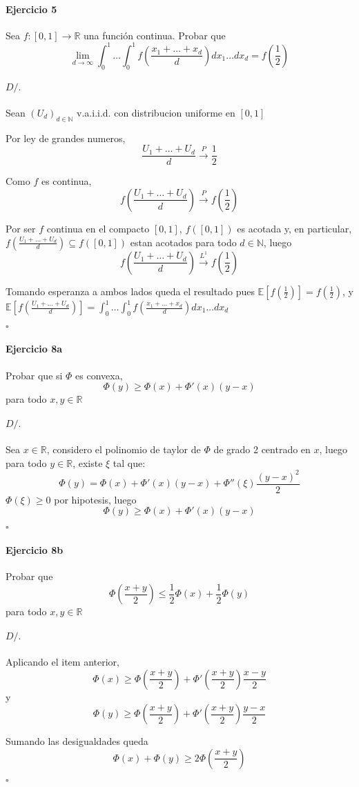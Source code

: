 \documentclass[10pt,a4paper]{article}
\newcommand{\R}{ \mathbb R }
\newcommand{\E}{ \mathbb E }
\newenvironment{ejercicio}[3]
{
	\paragraph{Ejercicio #1}
	#2
	\paragraph{$D/.$}
	#3
	$\square$
}{
}
\begin{document}
\begin{ejercicio}{5}{
	Sea $f:[0,1] \to \R$ una funci\'on continua. Probar que
	$$
		\lim_{d\to\infty}
		\int_0^1 \dots \int_0^1
		f(
		\frac{
			x_1 + \dots + x_d
		}{d}
		)
		dx_1 \dots dx_d
		=
		f(\frac{1}{2})
	$$
}{
	Sean $(U_d)_{d \in \mathbb N}$ v.a.i.i.d. con distribucion uniforme en $[0,1]$

	Por ley de grandes numeros,
	$$
		\frac {U_1 + \dots + U_d}{d} \overset{P}{\to} \frac{1}{2}
	$$

	Como $f$ es continua,
	$$
		f(\frac {U_1 + \dots + U_d}{d}) \overset{P}{\to} f(\frac{1}{2})
	$$

	Por ser $f$ continua en el compacto $[0,1]$, $f([0,1])$ es acotada y, en particular, $f(\frac {U_1 + \dots + U_d}{d}) \subseteq f([0,1])$ estan acotados para todo $d \in \mathbb N$, luego
	$$
		f(\frac {U_1 + \dots + U_d}{d}) \overset{L^1}{\to} f(\frac{1}{2})
	$$


	Tomando esperanza a ambos lados queda el resultado pues $\E[f(\frac{1}{2})] = f(\frac{1}{2})$, y
	$\E[f(\frac {U_1 + \dots + U_d}{d})]
	=
	\int_0^1 \dots \int_0^1
	f(
	\frac{
		x_1 + \dots + x_d
	}{d}
	)
	dx_1 \dots dx_d$

}
\end{ejercicio}


\begin{ejercicio}{8a}{
	Probar que si $\Phi$ es convexa,
	$$
		\Phi(y) \ge \Phi(x) + \Phi'(x)(y-x)
	$$
	para todo $ x,y \in \R $
}{
	Sea $x \in \R$, considero el polinomio de taylor de $\Phi$ de grado 2 centrado en $x$, luego para todo $y \in \R$, existe $\xi$ tal que:
	$$
		\Phi(y) = \Phi(x) + \Phi'(x) (y-x) + \Phi''(\xi) \frac{(y-x)^2}{2}
	$$
	$\Phi(\xi) \ge 0$ por hipotesis, luego
	$$
		\Phi(y) \ge \Phi(x) + \Phi'(x) (y-x)
	$$
}
\end{ejercicio}

\begin{ejercicio}{8b}{
	Probar que 
	$$
		\Phi(\frac{x+y}{2}) \le \frac{1}{2}\Phi(x) + \frac{1}{2}\Phi(y)
	$$
	para todo $ x,y \in \R $
}{
	Aplicando el item anterior,
	$$
		\Phi(x) \ge \Phi(\frac{x+y}{2}) + \Phi'(\frac{x+y}{2}) \frac{x-y}{2}
	$$
	y
	$$
		\Phi(y) \ge \Phi(\frac{x+y}{2}) + \Phi'(\frac{x+y}{2}) \frac{y-x}{2}
	$$

	Sumando las desigualdades queda
	$$
		\Phi(x) + \Phi(y) \ge 2 \Phi(\frac{x+y}{2})
	$$
}
\end{ejercicio}
\end{document}
